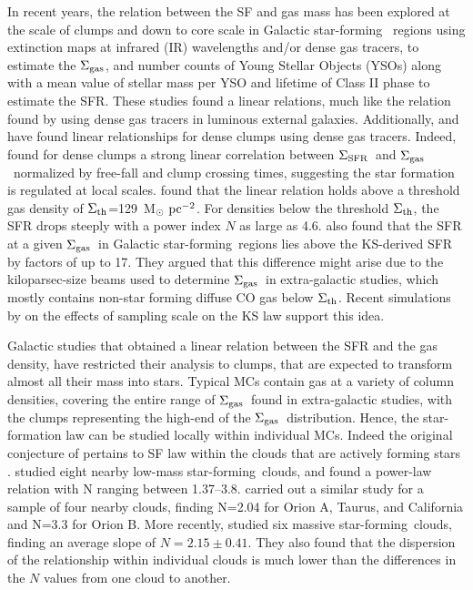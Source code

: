 \documentclass[iop]{emulateapj}
\newcommand{\starf}{star-forming}
\newcommand{\msunpc}{M$_{\odot}~{\rm pc}^{-2}$}
\newcommand{\sigsfr}{$\Sigma_{\rm SFR}$}
\newcommand{\siggas}{$\Sigma_{\rm gas}$}
\newcommand{\sigth}{$\Sigma_{\rm th}$}
\begin{document}
In recent years, the relation between the SF and gas mass has been explored 
at the scale of clumps and down to core scale in Galactic \starf~ regions 
\citep[e.g.][]{lada+10,heiderman+10} using extinction maps at infrared (IR)
wavelengths and/or dense gas tracers, to estimate the \siggas, and number counts 
of Young Stellar Objects (YSOs) along with a mean value of stellar mass per YSO 
and lifetime of Class II phase to estimate the SFR.
These studies found a linear relations, much like the relation found by 
\citet{gao+04} using dense gas tracers in luminous external galaxies.  
Additionally, \citet{wu+10} and \citet{heyer+16} have found linear relationships 
for dense clumps using dense gas tracers.
Indeed, \citet{heyer+16} found for dense clumps a strong linear correlation between 
\sigsfr~and \siggas~normalized by free-fall and clump crossing times, suggesting 
the star formation is regulated at local scales.  
\citet{heiderman+10} found that the linear relation holds above a threshold 
gas density of \sigth=129~\msunpc. For densities below the threshold \sigth, the SFR 
drops steeply with a power index $N$ as large as 4.6. \citet{heiderman+10} also 
found that the SFR at a given \siggas\ in Galactic \starf\ regions lies 
above the KS-derived SFR by factors of up to 17. 
They argued that this difference might arise due to the 
kiloparsec-size beams used to determine \siggas\ in extra-galactic studies,
which mostly contains non-star forming diffuse CO gas below \sigth.
Recent simulations by \citet{calzetti+2012} on the effects of 
sampling scale on the KS law support this idea.

Galactic studies that obtained a linear relation between the SFR and the
gas density, have restricted their analysis to clumps, that are expected
to transform almost all their mass into stars. Typical MCs contain gas at a 
variety of column densities, covering the entire range of \siggas\ found in 
extra-galactic studies, with the clumps representing the high-end of the \siggas\ 
distribution. Hence, the star-formation law can be  studied locally
within individual MCs. Indeed the original conjecture of \citet{schmidt59}
pertains to SF law within the clouds that are actively forming stars \citep{lada+13}.
\citet{gutermuth+11} studied eight nearby low-mass \starf\ clouds,
and found a power-law relation with N ranging between 1.37--3.8.
\citet{lada+13} carried out a similar study for a sample of 
four nearby clouds, finding N=2.04 for Orion A, Taurus, and California and 
N=3.3 for Orion B. More recently, \citet{willis+15} studied six massive \starf\ clouds, 
finding an average slope of $N=2.15\pm0.41$.
They also found that the dispersion of the relationship within individual
clouds is much lower than the differences in the $N$ values from one cloud to another. 
\end{document}
